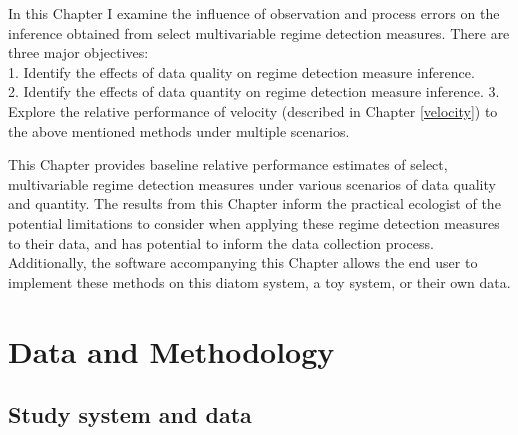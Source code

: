 \documentclass[12pt,twoside,openany]{reedthesis}
\begin{document}
In this Chapter I examine the influence of observation and process errors on the inference obtained from select multivariable regime detection measures. There are three major objectives:\\
1. Identify the effects of data quality on regime detection measure inference.\\
2. Identify the effects of data quantity on regime detection measure inference.
3. Explore the relative performance of velocity (described in Chapter \ref{velocity}) to the above mentioned methods under multiple scenarios.

This Chapter provides baseline relative performance estimates of select, multivariable regime detection measures under various scenarios of data quality and quantity. The results from this Chapter inform the practical ecologist of the potential limitations to consider when applying these regime detection measures to their data, and has potential to inform the data collection process. Additionally, the software accompanying this Chapter allows the end user to implement these methods on this diatom system, a toy system, or their own data.

\hypertarget{data-and-methodology}{%
\section{Data and Methodology}\label{data-and-methodology}}

\hypertarget{study-system-and-data}{%
\subsection{Study system and data}\label{study-system-and-data}}
\end{document}
